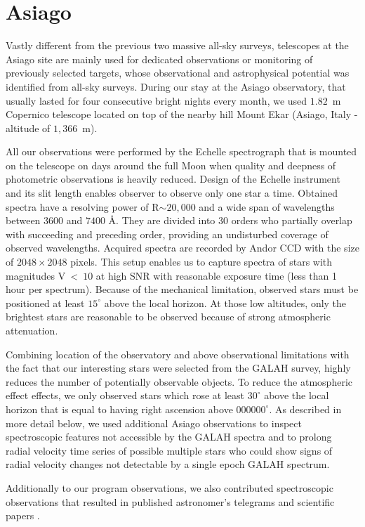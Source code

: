 \section{Asiago}
\label{sec:asiago_data}
Vastly different from the previous two massive all-sky surveys, telescopes at the Asiago site are mainly used for dedicated observations or monitoring of previously selected targets, whose observational and astrophysical potential was identified from all-sky surveys. During our stay at the Asiago observatory, that usually lasted for four consecutive bright nights every month, we used $1.82$~m Copernico telescope located on top of the nearby hill Mount Ekar (Asiago, Italy - altitude of $1,366$~m).

All our observations were performed by the Echelle spectrograph that is mounted on the telescope on days around the full Moon when quality and deepness of photometric observations is heavily reduced. Design of the Echelle instrument and its slit length enables observer to observe only one star a time. Obtained spectra have a resolving power of R$\sim20,000$ and a wide span of wavelengths between $3600$ and $7400$ \AA. They are divided into 30 orders who partially overlap with succeeding and preceding order, providing an undisturbed coverage of observed wavelengths. Acquired spectra are recorded by Andor CCD with the size of $2048 \times 2048$ pixels. This setup enables us to capture spectra of stars with magnitudes V~<~$10$ at high SNR with reasonable exposure time (less than 1 hour per spectrum). Because of the mechanical limitation, observed stars must be positioned at least $15^\circ$ above the local horizon. At those low altitudes, only the brightest stars are reasonable to be observed because of strong atmospheric attenuation.

Combining location of the observatory and above observational limitations with the fact that our interesting stars were selected from the GALAH survey, highly reduces the number of potentially observable objects. To reduce the atmospheric effect effects, we only observed stars which rose at least $30^\circ$ above the local horizon that is equal to having right ascension above $000000^\circ$. As described in more detail below, we used additional Asiago observations to inspect spectroscopic features not accessible by the GALAH spectra and to prolong radial velocity time series of possible multiple stars who could show signs of radial velocity changes not detectable by a single epoch GALAH spectrum.

Additionally to our program observations, we also contributed spectroscopic observations that resulted in published astronomer's telegrams \citep{2019ATel13340....1M} and scientific papers \citep{2019MNRAS.488.5536M}.